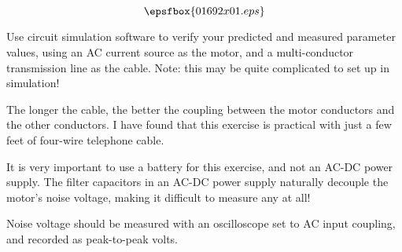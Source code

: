 

$$\epsfbox{01692x01.eps}$$

\vfil \eject






Use circuit simulation software to verify your predicted and measured parameter values, using an AC current source as the motor, and a multi-conductor transmission line as the cable.  Note: this may be quite complicated to set up in simulation!







The longer the cable, the better the coupling between the motor conductors and the other conductors.  I have found that this exercise is practical with just a few feet of four-wire telephone cable.

It is very important to use a battery for this exercise, and not an AC-DC power supply.  The filter capacitors in an AC-DC power supply naturally decouple the motor's noise voltage, making it difficult to measure any at all!

Noise voltage should be measured with an oscilloscope set to AC input coupling, and recorded as peak-to-peak volts.




